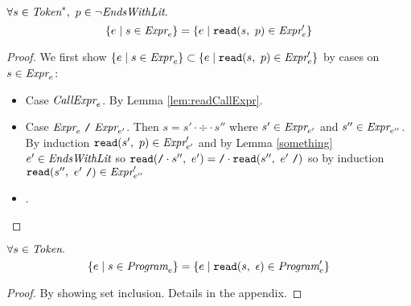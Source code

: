 \documentclass[preprint,10pt]{sigplanconf}
\begin{document}
\begin{lemma}
  \( \forall s \in \textit{Token}^{*},~p \in \neg \textit{EndsWithLit}. \)
  \[
  \{ e \mid s \in \textit{Expr}_{e} \}
  =
  \{ e \mid \texttt{read}(s,~p) \in \textit{Expr}_{e}' \}
  \]
\end{lemma}
\begin{proof}
  We first show 
  \( \{ e \mid s \in \textit{Expr}_{e} \} \subset
  \{ e \mid \texttt{read}(s,~p) \in \textit{Expr}_{e}' \}
  \)
  by cases on \( s \in \textit{Expr}_{e} \):
  \begin{itemize}
  \item Case \( \textit{CallExpr}_{e} \). By Lemma \ref{lem:readCallExpr}.

  \item Case \( \textit{Expr}_{e} ~\texttt{/}~ \textit{Expr}_{e'} \). 
    Then \( s = s' \cdot \div \cdot s'' \) where \( s' \in
    \textit{Expr}_{e'} \) and \( s'' \in \textit{Expr}_{e''}
    \). By induction \( \texttt{read}(s',~p) \in \textit{Expr}_{e'}' \) and
    by Lemma \ref{something} \( e' \in \textit{EndsWithLit} \) so \( \texttt{read}(\texttt{/}
      \cdot s'',~e') = \texttt{/} \cdot \texttt{read}(s'',~e'~\texttt{/}) \) so by
    induction \( \texttt{read}(s'',~e'~\texttt{/}) \in \textit{Expr}_{e''}' \)
  \item .
  \end{itemize}
\end{proof}

\begin{theorem}\mbox{}

  \( \forall s \in \textit{Token}. \)
  \[
  \{ e \mid s \in \textit{Program}_{e} \}
  =
  \{ e \mid \texttt{read}(s,~\epsilon) \in \textit{Program}_{e}' \}
  \]
\end{theorem}
\begin{proof}\mbox{}
  
By showing set inclusion. Details in the appendix.
\end{proof}
\end{document}
